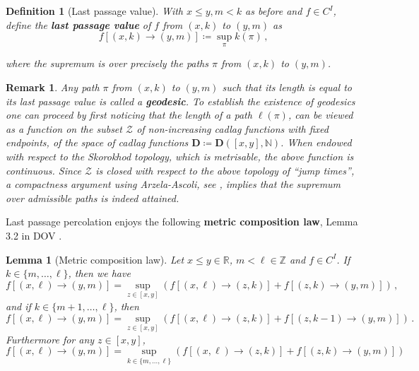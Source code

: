 \documentclass[11pt, reqno]{amsart}
\numberwithin{equation}{section}
\newcounter{dummy} \numberwithin{dummy}{section}
\newtheorem{definition}[dummy]{Definition}
\newtheorem{lemma}[dummy]{Lemma}
\newtheorem*{remark}{Remark}
\newcommand{\N}{\ensuremath{\mathbb{N}}}
\begin{document}
\begin{definition}[Last passage value]\label{Definition: last passage}
    With \(x\leq y, m<k\) as before and \(f\in C^{I}\), define the \textbf{last passage value} of \(f\) from \((x,k)\) to \((y,m)\) as
    \[
    f[(x,k)\to(y,m)] \coloneqq \displaystyle \sup_{\pi}k(\pi)\,,
\]

where the supremum is over precisely the paths \(\pi\) from \((x,k)\) to \((y,m)\).
\end{definition}%
\begin{remark}
    Any path \(\pi\) from \((x,k)\) to \((y,m)\) such that its length is equal to its last passage value is called a \textbf{geodesic}. To establish the existence of geodesics one can proceed by first noticing that the length of a path \(\ell(\pi)\), can be viewed as a function on the subset \(\mathcal{Z}\) of non-increasing cadlag functions with fixed endpoints, of the space of cadlag functions \(\mathbf{D}\coloneqq \mathbf{D}([x,y], \N)\). When endowed with respect to the  Skorokhod topology, which is metrisable, the above function is continuous. Since \(\mathcal Z\) is closed with respect to the above topology of \textquotedblleft jump times\textquotedblright, a compactness argument using Arzela-Ascoli, see \cite[ch. 3]{billingsley2013convergence}, implies that the supremum over admissible paths is indeed attained.
\end{remark}



Last passage percolation enjoys the following \textbf{metric composition law}, Lemma 3.2 in DOV \cite{DOV}.

\begin{lemma}[Metric composition law]\label{Lemma: Metric Composition}
    Let \(x\leq y \in \mathbb{R}\), \(m < \ell\in\mathbb{Z}\) and \(f\in C^I\). If \(k\in \{m, \dots, \ell\}\), then we have
    \[
    f[(x,\ell)\to(y,m)] = \displaystyle \sup_{z\in[x,y]}(f[(x,\ell)\to(z,k)]+f[(z,k)\to(y,m)])\,,
    \]
    and if \(k\in \{m+1, \dots, \ell\}\), then 
    \[
    f[(x,\ell)\to(y,m)] = \displaystyle \sup_{z\in[x,y]}(f[(x,\ell)\to(z,k)]+f[(z,k-1)\to(y,m)])\,.
    \]
    Furthermore for any \(z\in [x,y]\), 
    \begin{equation}\label{eq: composition}
    f[(x,\ell)\to(y,m)] = \displaystyle \sup_{k\in \{m, \dots, \ell\}}(f[(x,\ell)\to(z,k)]+f[(z,k)\to(y,m)])
    \end{equation}
\end{lemma}%
\end{document}
